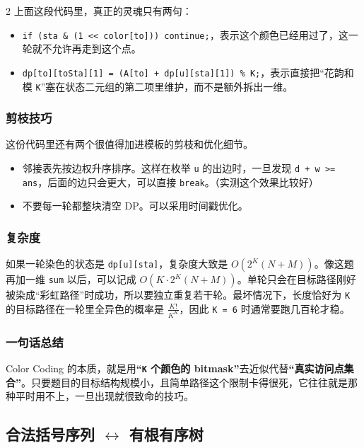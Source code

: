 \begin{multicols*}{2}
		上面这段代码里，真正的灵魂只有两句：

		\begin{itemize}
			\item \texttt{if (sta \& (1 << color[to])) continue;}，表示这个颜色已经用过了，这一轮就不允许再走到这个点。
			\item \texttt{dp[to][toSta][1] = (A[to] + dp[u][sta][1]) \% K;}，表示直接把“花韵和模 \texttt{K}”塞在状态二元组的第二项里维护，而不是额外拆出一维。
		\end{itemize}

		\subsubsection{剪枝技巧}

		这份代码里还有两个很值得加进模板的剪枝和优化细节。

		\begin{itemize}
			\item 邻接表先按边权升序排序。这样在枚举 \texttt{u} 的出边时，一旦发现 \texttt{d + w >= ans}，后面的边只会更大，可以直接 \texttt{break}。（实测这个效果比较好）
			\item 不要每一轮都整块清空 DP。可以采用时间戳优化。
		\end{itemize}

		\subsubsection{复杂度}

		如果一轮染色的状态是 \texttt{dp[u][sta]}，复杂度大致是 $O(2^K (N + M))$。像这题再加一维 \texttt{sum} 以后，可以记成 $O(K \cdot 2^K (N + M))$。单轮只会在目标路径刚好被染成“彩虹路径”时成功，所以要独立重复若干轮。最坏情况下，长度恰好为 \texttt{K} 的目标路径在一轮里全异色的概率是 $\frac{K!}{K^K}$，因此 \texttt{K = 6} 时通常要跑几百轮才稳。

		\subsubsection{一句话总结}

		Color Coding 的本质，就是用\textbf{“\texttt{K} 个颜色的 bitmask”}去近似代替\textbf{“真实访问点集合”}。只要题目的目标结构规模小，且简单路径这个限制卡得很死，它往往就是那种平时用不上，一旦出现就很致命的技巧。

		\subsection{\texorpdfstring{合法括号序列 $\leftrightarrow$ 有根有序树}{合法括号序列 <-> 有根有序树}}


\end{multicols*}
